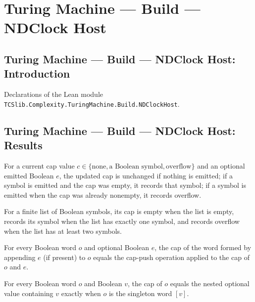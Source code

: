 \section{Turing Machine --- Build --- NDClock Host}
\subsection*{Turing Machine --- Build --- NDClock Host: Introduction}

Declarations of the Lean module \texttt{TCSlib.Complexity.TuringMachine.Build.NDClockHost}.

\subsection*{Turing Machine --- Build --- NDClock Host: Results}

\begin{definition}
\label{Turing.capPush}
\leanok
For a current cap value $c\in\{\text{none},\text{a Boolean symbol},\text{overflow}\}$
and an optional emitted Boolean $e$, the updated cap is unchanged if nothing is emitted;
if a symbol is emitted and the cap was empty, it records that symbol; if a symbol is
emitted when the cap was already nonempty, it records overflow.
\end{definition}

\begin{definition}
\label{Turing.capOf}
\leanok
For a finite list of Boolean symbols, its cap is empty when the list is empty, records
its symbol when the list has exactly one symbol, and records overflow when the list has
at least two symbols.
\end{definition}

\begin{theorem}
\label{Turing.capOf_append}
\leanok
{}
For every Boolean word $o$ and optional Boolean $e$, the cap of the word formed by
appending $e$ (if present) to $o$ equals the cap-push operation applied to the cap of
$o$ and $e$.
\end{theorem}

\begin{theorem}
\label{Turing.capOf_eq_some_some}
\leanok
{}
For every Boolean word $o$ and Boolean $v$, the cap of $o$ equals the nested optional
value containing $v$ exactly when $o$ is the singleton word $[v]$.
\end{theorem}

